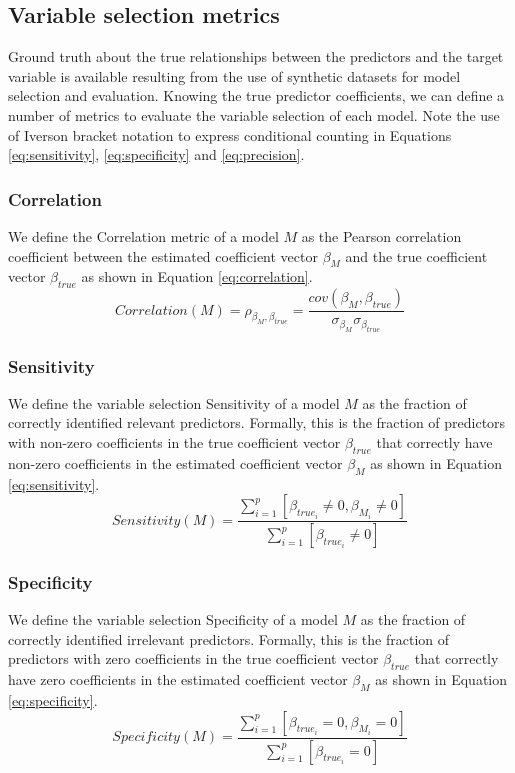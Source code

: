\subsection{Variable selection metrics}
Ground truth about the true relationships between the predictors and the target variable is available resulting from the use of synthetic datasets for model selection and evaluation. Knowing the true predictor coefficients, we can define a number of metrics to evaluate the variable selection of each model. Note the use of Iverson bracket notation to express conditional counting in Equations \ref{eq:sensitivity}, \ref{eq:specificity} and \ref{eq:precision}.

\subsubsection{Correlation}
We define the Correlation metric of a model $M$ as the Pearson correlation coefficient between the estimated coefficient vector $\beta_M$ and the true coefficient vector $\beta_{true}$ as shown in Equation \ref{eq:correlation}. 
\begin{equation} \label{eq:correlation}
Correlation(M) = \rho_{\beta_M,\beta_{true}} = \frac{cov(\beta_M,\beta_{true})}{\sigma_{\beta_M} \sigma_{\beta_{true}}}
\end{equation}

\subsubsection{Sensitivity}
We define the variable selection Sensitivity of a model $M$ as the fraction of correctly identified relevant predictors. Formally, this is the fraction of predictors with non-zero coefficients in the true coefficient vector $\beta_{true}$ that correctly have non-zero coefficients in the estimated coefficient vector $\beta_M$ as shown in Equation \ref{eq:sensitivity}. 
\begin{equation} \label{eq:sensitivity}
Sensitivity(M) = \frac{\sum_{i=1}^{p}[\beta_{true_i} \ne 0, \beta_{M_i} \ne 0]}{\sum_{i=1}^{p}[\beta_{true_i} \ne 0]}
\end{equation}

\subsubsection{Specificity}
We define the variable selection Specificity of a model $M$ as the fraction of correctly identified irrelevant predictors. Formally, this is the fraction of predictors with zero coefficients in the true coefficient vector $\beta_{true}$ that correctly have zero coefficients in the estimated coefficient vector $\beta_M$ as shown in Equation \ref{eq:specificity}. 
\begin{equation} \label{eq:specificity}
Specificity(M) = \frac{\sum_{i=1}^{p}[\beta_{true_i} = 0, \beta_{M_i} = 0]}{\sum_{i=1}^{p}[\beta_{true_i} = 0]}
\end{equation}

